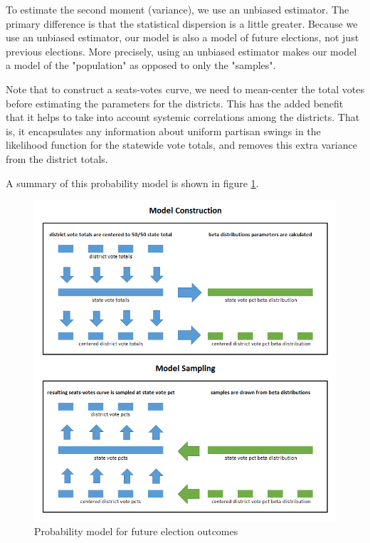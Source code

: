 \documentclass[preprint,12pt]{article}
\begin{document}
To estimate the second moment (variance), we use an unbiased estimator.  The primary difference is that the statistical dispersion is a little greater.  Because we use an unbiased estimator, our model is also a model of future elections, not just previous elections.  More precisely, using an unbiased estimator makes our model a model of the "population" as opposed to only the "samples".
 
Note that to construct a seats-votes curve, we need to mean-center the total votes before estimating the parameters for the districts.  This has the added benefit that it helps to take into account systemic correlations among the districts.  That is, it encapsulates any information about uniform partisan swings in the likelihood function for the statewide vote totals, and removes this extra variance from the district totals.

A summary of this probability model is shown in figure \ref{fig:ProbabilityModel}.

\begin{figure}[htb!]
    \begin{center}
        \includegraphics[scale=1.0]{../Figures/WI2010/probabilityModel.png}
        \caption{Probability model for future election outcomes}\label{fig:ProbabilityModel}
    \end{center}
\end{figure}
\end{document}
